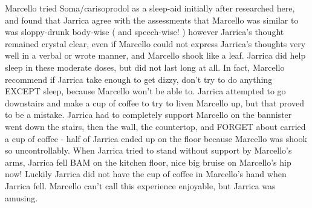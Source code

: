 \documentclass[12pt]{book}
\begin{document}
Marcello tried Soma/carisoprodol as a sleep-aid initially after researched here, and found that Jarrica agree with the assessments that Marcello was similar to was sloppy-drunk body-wise ( and speech-wise! ) however Jarrica's thought remained crystal clear, even if Marcello could not express Jarrica's thoughts very well in a verbal or wrote manner, and Marcello shook like a leaf. Jarrica did help sleep in these moderate doses, but did not last long at all. In fact, Marcello recommend if Jarrica take enough to get dizzy, don't try to do anything EXCEPT sleep, because Marcello won't be able to. Jarrica attempted to go downstairs and make a cup of coffee to try to liven Marcello up, but that proved to be a mistake. Jarrica had to completely support Marcello on the bannister went down the stairs, then the wall, the countertop, and FORGET about carried a cup of coffee - half of Jarrica ended up on the floor because Marcello was shook so uncontrollably. When Jarrica tried to stand without support by Marcello's arms, Jarrica fell BAM on the kitchen floor, nice big bruise on Marcello's hip now! Luckily Jarrica did not have the cup of coffee in Marcello's hand when Jarrica fell. Marcello can't call this experience enjoyable, but Jarrica was amusing.
\end{document}
